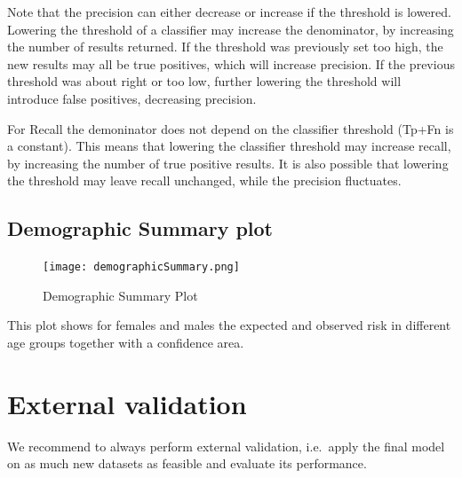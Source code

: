 \documentclass[]{article}
\begin{document}
Note that the precision can either decrease or increase if the threshold
is lowered. Lowering the threshold of a classifier may increase the
denominator, by increasing the number of results returned. If the
threshold was previously set too high, the new results may all be true
positives, which will increase precision. If the previous threshold was
about right or too low, further lowering the threshold will introduce
false positives, decreasing precision.

For Recall the demoninator does not depend on the classifier threshold
(Tp+Fn is a constant). This means that lowering the classifier threshold
may increase recall, by increasing the number of true positive results.
It is also possible that lowering the threshold may leave recall
unchanged, while the precision fluctuates.

\newpage

\subsection{Demographic Summary plot}\label{demographic-summary-plot}

\begin{figure}
\centering
\texttt{[image: demographicSummary.png]}
\caption{Demographic Summary Plot}
\end{figure}

This plot shows for females and males the expected and observed risk in
different age groups together with a confidence area.

\newpage

\section{External validation}\label{external-validation}

We recommend to always perform external validation, i.e.~apply the final
model on as much new datasets as feasible and evaluate its performance.
\end{document}
